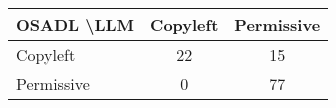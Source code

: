 \begin{tabular}{l|cc}\hline
	\textbf{OSADL \textbackslash LLM} & Copyleft & Permissive\\\hline
	Copyleft & 22 & 15\\
	Permissive & 0 & 77\\\hline
\end{tabular}
